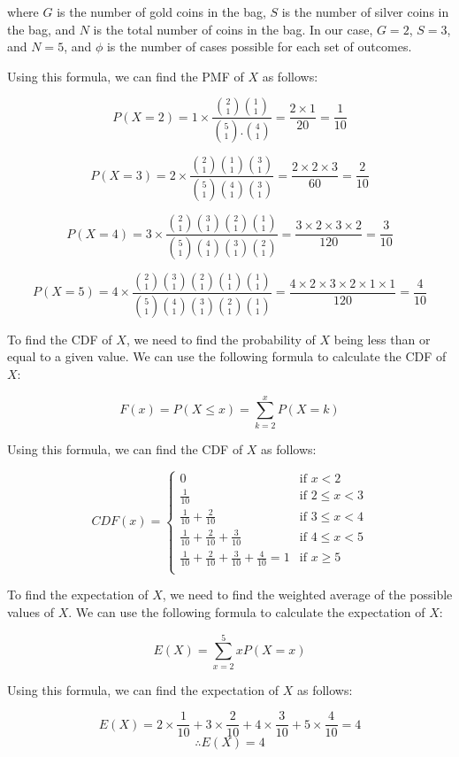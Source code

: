 \documentclass{article}
\theoremstyle{definition}
\begin{document}
where $G$ is the number of gold coins in the bag, $S$ is the number of silver coins in the bag, and $N$ is the total number of coins in the bag. In our case, $G = 2$, $S = 3$, and $N = 5$, and $\phi $ is the number of cases possible for each set of outcomes.

Using this formula, we can find the PMF of $X$ as follows:

$$P(X = 2) = 1 \times \frac{\binom{2}{1} \binom{1}{1}}{\binom{5}{1}. \binom{4}{1}} = \frac{2 \times 1}{20} = \frac{1}{10}$$

$$P(X = 3) = 2 \times \frac{\binom{2}{1} \binom{1}{1}\binom{3}{1}}{\binom{5}{1}\binom{4}{1}\binom{3}{1}} = \frac{2 \times 2 \times 3}{60} = \frac{2}{10}$$

$$P(X = 4) = 3 \times \frac{\binom{2}{1} \binom{3}{1} \binom{2}{1} \binom{1}{1}}{\binom{5}{1}\binom{4}{1}\binom{3}{1}\binom{2}{1}} = \frac{3 \times 2 \times 3 \times 2 }{120} = \frac{3}{10}$$

$$P(X = 5) = 4 \times \frac{\binom{2}{1} \binom{3}{1} \binom{2}{1} \binom{1}{1} \binom{1}{1}}{\binom{5}{1}\binom{4}{1}\binom{3}{1}\binom{2}{1} \binom{1}{1}} = \frac{4 \times 2 \times 3 \times 2 \times 1 \times 1 }{120} = \frac{4 }{10}$$


To find the CDF of $X$, we need to find the probability of $X$ being less than or equal to a given value. We can use the following formula to calculate the CDF of $X$:

$$F(x) = P(X \leq x) = \sum_{k=2}^{x} P(X = k)$$

Using this formula, we can find the CDF of $X$ as follows:

\[
CDF(x) = \left\{
\begin{array}{ll}
0 & \text{if } x<2 \\
\frac{1}{10} & \text{if } 2 \leq x < 3 \\
\frac{1}{10} + \frac{2}{10} & \text{if } 3 \leq x < 4 \\
\frac{1}{10} + \frac{2}{10} + \frac{3}{10} & \text{if } 4 \leq x < 5 \\
\frac{1}{10} + \frac{2}{10} + \frac{3}{10} + \frac{4}{10}=1 & \text{if } x \geq 5 \\
\end{array}
\right.
\]


To find the expectation of $X$, we need to find the weighted average of the possible values of $X$. We can use the following formula to calculate the expectation of $X$:

$$E(X) = \sum_{x=2}^{5} x P(X = x)$$

Using this formula, we can find the expectation of $X$ as follows:

$$E(X) = 2 \times \frac{1}{10} + 3 \times \frac{2}{10} + 4 \times \frac{3}{10} + 5 \times \frac{4}{10} = 4$$
\[
\therefore E(X) =4
\]
\end{document}
